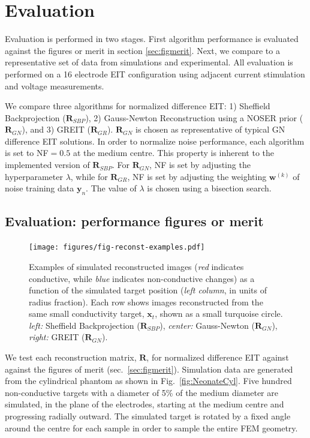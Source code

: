 \documentclass[12pt]{iopart}
\newcommand{\xB}{\mbox{$\mathbf{x}$}}
\newcommand{\yB}{\mbox{$\mathbf{y}$}}
\newcommand{\wB}{\mbox{$\mathbf{w}$}}
\newcommand{\RB}{\mbox{$\mathbf{R}$}}
\begin{document}
\section{Evaluation}

Evaluation is performed in two stages. First algorithm performance
is evaluated against the figures or merit in section
\ref{sec:figmerit}.
Next, we compare to a representative set of data
from simulations and experimental.
All evaluation is performed on a 16 electrode EIT configuration
using adjacent current stimulation and voltage measurements.

We compare three algorithms for normalized
difference EIT:
1) Sheffield Backprojection
    ($\RB_{SBP}$), 
2) Gauss-Newton Reconstruction using a
   NOSER prior
    ($\RB_{GN}$), 
and
3) GREIT ($\RB_{GR}$). 
$\RB_{GN}$ is chosen as representative
of typical GN difference EIT solutions.
 In order to normalize
noise performance, each algorithm is set to
NF$=0.5$ at the medium centre. This property
is inherent to the implemented version
of $\RB_{SBP}$. 
For $\RB_{GN}$, NF is set by 
adjusting the hyperparameter $\lambda$, while
for $\RB_{GR}$, NF is set by 
adjusting the weighting $\wB^{(k)}$ of noise
training data $\yB_n$. The value of $\lambda$ is chosen using
a bisection search.


\subsection{Evaluation: performance figures or merit}
\label{sec:perffigm}

\begin{figure}[bhtp]
\begin{center}
\texttt{[image: figures/fig-reconst-examples.pdf]}
\caption{
\label{fig:FoMimages}
Examples of simulated reconstructed images
({\em red} indicates conductive, while
 {\em blue} indicates non-conductive changes)
 as a function of the simulated target position
({\em left column}, in units of radius fraction). Each row
shows images reconstructed from the same small 
conductivity target, $\xB_t$, shown as 
a small turquoise circle.
{\em left:} Sheffield Backprojection ($\RB_{SBP}$),
{\em center:} Gauss-Newton ($\RB_{GN}$),
{\em right:} GREIT ($\RB_{GN}$).
}
\end{center}
\end{figure}

We test each reconstruction matrix, $\RB$,
for normalized difference EIT
against against the figures of merit 
(sec.\ \ref{sec:figmerit}). Simulation data
are generated from the cylindrical phantom
as shown in Fig.\ \ref{fig:NeonateCyl}. 
Five hundred 
non-conductive targets with a diameter of
5\% of the medium diameter are simulated,
 in the plane of the electrodes,
starting at the medium centre and 
progressing radially outward. The simulated 
target is rotated by a fixed angle around the centre
for each sample in order to sample the entire
FEM geometry.
\end{document}
